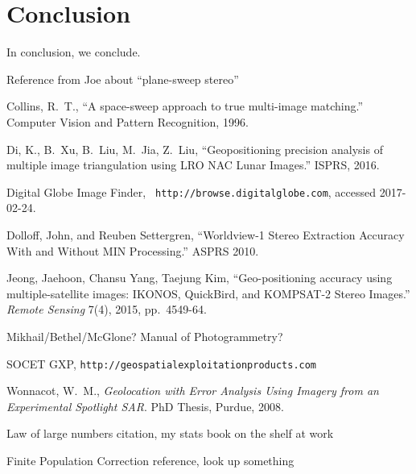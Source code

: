 \documentclass[10pt]{amsart}
\begin{document}
\section{Conclusion}
In conclusion, we conclude.





\begin{thebibliography}{9} %

Reference from Joe about ``plane-sweep stereo''

Collins, R.~T., ``A space-sweep approach to true
  multi-image matching.'' Computer Vision and Pattern Recognition, 1996.

Di, K., B.~Xu, B.~Liu, M.~Jia, Z.~Liu, ``Geopositioning
  precision analysis of multiple image triangulation using LRO NAC Lunar
  Images.'' ISPRS, 2016.

Digital Globe Image Finder, {\tt
  http://browse.digitalglobe.com}, accessed 2017-02-24.

Dolloff, John, and Reuben Settergren, ``Worldview-1 Stereo
  Extraction Accuracy With and Without MIN Processing.'' ASPRS 2010.

Jeong, Jaehoon, Chansu Yang, Taejung Kim, ``Geo-positioning
  accuracy using multiple-satellite images: IKONOS, QuickBird, and KOMPSAT-2
  Stereo Images.'' {\em Remote Sensing} 7(4), 2015, pp.~4549-64.

Mikhail/Bethel/McGlone? Manual of Photogrammetry?

SOCET GXP, {\tt http://geospatialexploitationproducts.com}

Wonnacot, W.~M., {\em Geolocation with Error Analysis
  Using Imagery from an Experimental Spotlight SAR}. PhD Thesis, Purdue, 2008.

Law of large numbers citation, my stats book on the shelf at work

Finite Population Correction reference, look up something


\end{thebibliography}
 
\end{document}
